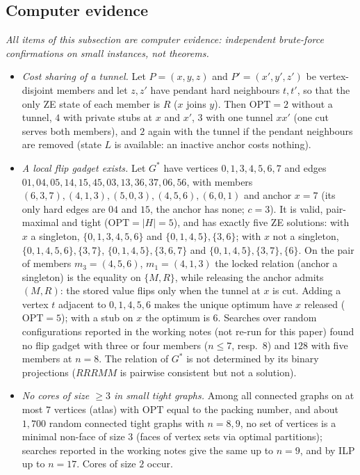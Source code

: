 \subsection{Computer evidence}
\emph{All items of this subsection are computer evidence: independent brute-force confirmations on small instances, not theorems.}
{\sloppy
\begin{itemize}
\item \emph{Cost sharing of a tunnel.} Let $P=(x,y,z)$ and $P'=(x',y',z')$ be vertex-disjoint members and let $z,z'$ have pendant hard neighbours $t,t'$, so that the only ZE state of each member is $R$ ($x$ joins $y$). Then $\mathrm{OPT}=2$ without a tunnel, $4$ with private stubs at $x$ and $x'$, $3$ with one tunnel $xx'$ (one cut serves both members), and $2$ again with the tunnel if the pendant neighbours are removed (state $L$ is available: an inactive anchor costs nothing).
\item \emph{A local flip gadget exists.} Let $G^*$ have vertices $0,1,3,4,5,6,7$ and edges $01,04,05,14,15,45,03,13,36,37,06,56$, with members $(6,3,7),(4,1,3),(5,0,3),(4,5,6),(6,0,1)$ and anchor $x=7$ (its only hard edges are $04$ and $15$, the anchor has none; $c=3$). It is valid, pair-maximal and tight ($\mathrm{OPT}=|H|=5$), and has exactly five ZE solutions: with $x$ a singleton, $\{0,1,3,4,5,6\}$ and $\{0,1,4,5\},\{3,6\}$; with $x$ not a singleton, $\{0,1,4,5,6\},\{3,7\}$, $\{0,1,4,5\},\{3,6,7\}$ and $\{0,1,4,5\},\{3,7\},\{6\}$. On the pair of members $m_3=(4,5,6)$, $m_1=(4,1,3)$ the locked relation (anchor a singleton) is the equality on $\{M,R\}$, while releasing the anchor admits $(M,R)$: the stored value flips only when the tunnel at $x$ is cut. Adding a vertex $t$ adjacent to $0,1,4,5,6$ makes the unique optimum have $x$ released ($\mathrm{OPT}=5$); with a stub on $x$ the optimum is $6$. Searches over random configurations reported in the working notes (not re-run for this paper) found no flip gadget with three or four members ($n\le7$, resp.\ $8$) and $128$ with five members at $n=8$. The relation of $G^*$ is not determined by its binary projections ($RRRMM$ is pairwise consistent but not a solution).
\item \emph{No cores of size $\ge3$ in small tight graphs.} Among all connected graphs on at most $7$ vertices (atlas) with $\mathrm{OPT}$ equal to the packing number, and about $1{,}700$ random connected tight graphs with $n=8,9$, no set of vertices is a minimal non-face of size $3$ (faces of vertex sets via optimal partitions); searches reported in the working notes give the same up to $n=9$, and by ILP up to $n=17$. Cores of size $2$ occur.

\end{itemize}}
